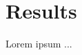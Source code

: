 \documentclass[Results]{subfiles}
\begin{document}
\section{Results}
\label{sec:Results}
Lorem ipsum ...
\end{document}
